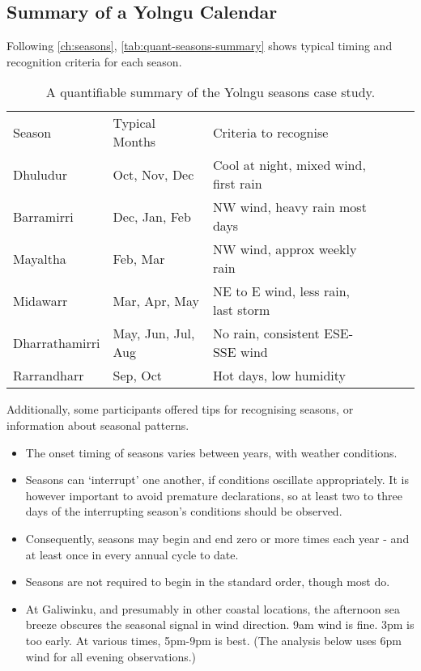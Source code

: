 \subsection{Summary of a Yolngu Calendar}
Following \autoref{ch:seasons}, \autoref{tab:quant-seasons-summary} shows
typical timing and recognition criteria for each season.


\begin{table}[h]
    \centering
    \begin{tabular}{llllll}
        Season          &  Typical Months       &  Criteria to recognise                    \\
        Dhuludur        &  Oct, Nov, Dec        &  Cool at night, mixed wind, first rain    \\
        Barramirri      &  Dec, Jan, Feb        &  NW wind, heavy rain most days            \\
        Mayaltha        &  Feb, Mar             &  NW wind, approx weekly rain              \\
        Midawarr        &  Mar, Apr, May        &  NE to E wind, less rain, last storm      \\
        Dharrathamirri  &  May, Jun, Jul, Aug   &  No rain, consistent ESE-SSE wind         \\
        Rarrandharr     &  Sep, Oct             &  Hot days, low humidity                   
    \end{tabular}
    \caption{A quantifiable summary of the Yolngu seasons case study.}
    \label{tab:quant-seasons-summary}
\end{table}


Additionally, some participants offered tips for recognising seasons,
or information about seasonal patterns.

\begin{itemize}
\item The onset timing of seasons varies between years, with weather conditions. 

\item Seasons can `interrupt' one another, if conditions oscillate appropriately.
        It is however important to avoid premature declarations, so at least two to
        three days of the interrupting season's conditions should be observed.

\item Consequently, seasons may begin and end zero or more times each year -
        and at least once in every annual cycle to date.

\item Seasons are not required to begin in the standard order, though most do.

\item At Galiwinku, and presumably in other coastal locations, the afternoon
        sea breeze obscures the seasonal signal in wind direction.
        9am wind is fine.  3pm is too early.  At various times, 5pm-9pm is best.
        (The analysis below uses 6pm wind for all evening observations.)
\end{itemize}




